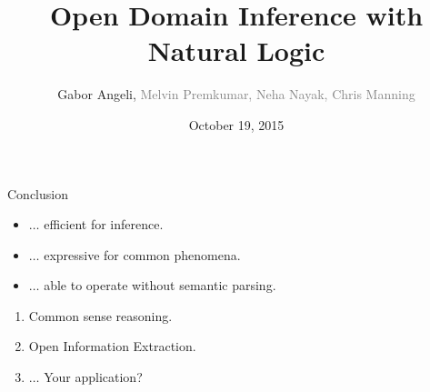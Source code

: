 \documentclass[hyperref,xcolor=table]{beamer}
\title{Open Domain Inference with Natural Logic}
\subtitle{}
\author[Angeli, Premkumar, Nayak, Manning]{Gabor Angeli, \textcolor{gray}{Melvin Premkumar, Neha Nayak, Chris Manning}}
\date{October 19, 2015}
\institute[Stanford]{Stanford University}
\begin{document}
\begin{frame}
  \titlepage
\end{frame}








\begin{frame}{Conclusion}
\begin{itemize}
\item $\dots$ efficient for inference.
\item $\dots$ expressive for common phenomena.
\item $\dots$ able to operate without semantic parsing.
\end{itemize}
\vspace{2ex}

\begin{enumerate}
\item Common sense reasoning.
\item Open Information Extraction.
\item $\dots$ Your application?
\end{enumerate}
\vspace{2ex}

\begin{center}
\end{center}
\end{frame}


\end{document}
